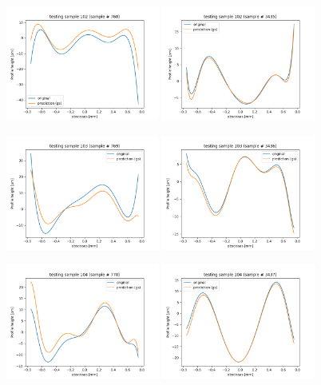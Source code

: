 \documentclass{iucr}
\begin{document}
\begin{figure}
 
    \includegraphics[width=0.45\textwidth]{figures/v12p102.png}
    \includegraphics[width=0.45\textwidth]{figures/v13p102.png}

    
    \includegraphics[width=0.45\textwidth]{figures/v12p103.png}
    \includegraphics[width=0.45\textwidth]{figures/v13p103.png}

    \includegraphics[width=0.45\textwidth]{figures/v12p104.png}
    \includegraphics[width=0.45\textwidth]{figures/v13p104.png}



\end{figure}
\end{document}
